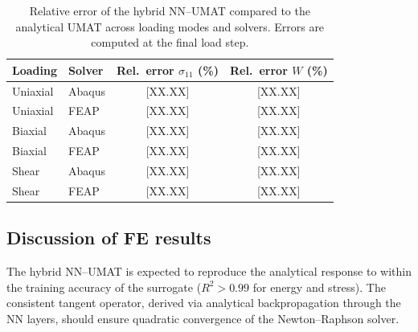 \begin{table}[htbp]
\centering
\caption{Relative error of the hybrid NN--UMAT compared to the analytical
  UMAT across loading modes and solvers.  Errors are computed at the final
  load step.}
\label{tab:fe_errors}
\begin{tabular}{@{}llcc@{}}
\toprule
\textbf{Loading} & \textbf{Solver}
  & \textbf{Rel.\ error $\sigma_{11}$ (\%)}
  & \textbf{Rel.\ error $W$ (\%)} \\
\midrule
Uniaxial & Abaqus & {[XX.XX]} & {[XX.XX]} \\
Uniaxial & FEAP   & {[XX.XX]} & {[XX.XX]} \\
Biaxial  & Abaqus & {[XX.XX]} & {[XX.XX]} \\
Biaxial  & FEAP   & {[XX.XX]} & {[XX.XX]} \\
Shear    & Abaqus & {[XX.XX]} & {[XX.XX]} \\
Shear    & FEAP   & {[XX.XX]} & {[XX.XX]} \\
\bottomrule
\end{tabular}
\end{table}

\subsection{Discussion of FE results}


The hybrid NN--UMAT is expected to reproduce the analytical response to within
the training accuracy of the surrogate ($R^2 > 0.99$ for energy and stress).
The consistent tangent operator, derived via analytical backpropagation through
the NN layers, should ensure quadratic convergence of the Newton--Raphson
solver.


